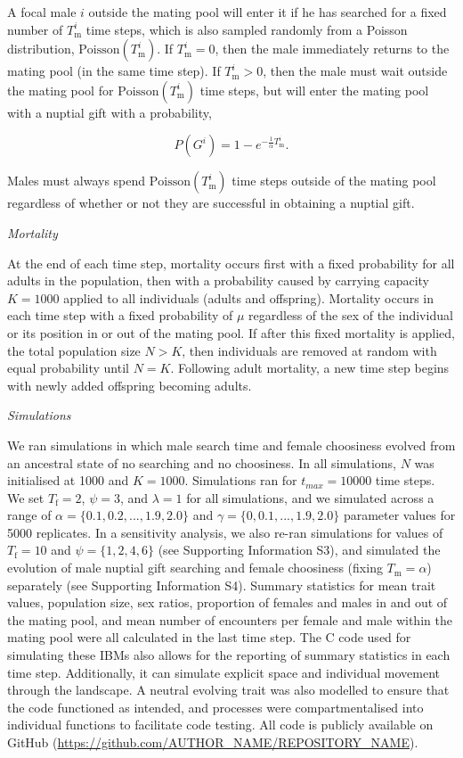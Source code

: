 \documentclass[
]{article}
\begin{document}
A focal male \(i\) outside the mating pool will enter it if he has
searched for a fixed number of \(T^{i}_{\mathrm{m}}\) time steps, which
is also sampled randomly from a Poisson distribution,
\(\mathrm{Poisson}(T^{i}_{\mathrm{m}})\). If \(T^{i}_{\mathrm{m}} = 0\),
then the male immediately returns to the mating pool (in the same time
step). If \(T^{i}_{\mathrm{m}} > 0\), then the male must wait outside
the mating pool for \(\mathrm{Poisson}(T^{i}_{\mathrm{m}})\) time steps,
but will enter the mating pool with a nuptial gift with a probability,

\[P(G^{i}) = 1 - e^{-\frac{1}{\alpha}T^{i}_{\mathrm{m}}}.\]

Males must always spend \(\mathrm{Poisson}(T^{i}_{\mathrm{m}})\) time
steps outside of the mating pool regardless of whether or not they are
successful in obtaining a nuptial gift.

\emph{Mortality}

At the end of each time step, mortality occurs first with a fixed
probability for all adults in the population, then with a probability
caused by carrying capacity \(K = 1000\) applied to all individuals
(adults and offspring). Mortality occurs in each time step with a fixed
probability of \(\mu\) regardless of the sex of the individual or its
position in or out of the mating pool. If after this fixed mortality is
applied, the total population size \(N > K\), then individuals are
removed at random with equal probability until \(N = K\). Following
adult mortality, a new time step begins with newly added offspring
becoming adults.

\emph{Simulations}

We ran simulations in which male search time and female choosiness
evolved from an ancestral state of no searching and no choosiness. In
all simulations, \(N\) was initialised at 1000 and \(K = 1000\).
Simulations ran for \(t_{max} = 10000\) time steps. We set
\(T_{\mathrm{f}} = 2\), \(\psi = 3\), and \(\lambda = 1\) for all
simulations, and we simulated across a range of
\(\alpha = \{0.1, 0.2, ..., 1.9, 2.0\}\) and
\(\gamma = \{0, 0.1, ..., 1.9, 2.0\}\) parameter values for 5000
replicates. In a sensitivity analysis, we also re-ran simulations for
values of \(T_{\mathrm{f}} = 10\) and \(\psi = \{1, 2, 4, 6 \}\) (see
Supporting Information S3), and simulated the evolution of male nuptial
gift searching and female choosiness (fixing
\(T_{\mathrm{m}} = \alpha\)) separately (see Supporting Information S4).
Summary statistics for mean trait values, population size, sex ratios,
proportion of females and males in and out of the mating pool, and mean
number of encounters per female and male within the mating pool were all
calculated in the last time step. The C code used for simulating these
IBMs also allows for the reporting of summary statistics in each time
step. Additionally, it can simulate explicit space and individual
movement through the landscape. A neutral evolving trait was also
modelled to ensure that the code functioned as intended, and processes
were compartmentalised into individual functions to facilitate code
testing. All code is publicly available on GitHub
(\url{https://github.com/AUTHOR_NAME/REPOSITORY_NAME}).
\end{document}

